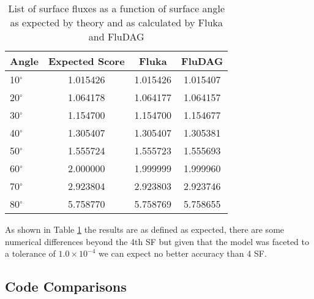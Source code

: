 \documentclass{anstrans}
\begin{document}

\begin{table}[h!]
        \begin{center}
                \begin{tabular}{|l|c|c|c|}
                  \hline
                        Angle & Expected Score & Fluka  & FluDAG \\
                        \hline
                        10$^{\circ}$ & 1.015426 & 1.015426 & 1.015407\\
                        20$^{\circ}$ & 1.064178 & 1.064177 & 1.064157\\
                        30$^{\circ}$ & 1.154700 & 1.154700 & 1.154677\\
                        40$^{\circ}$ & 1.305407 & 1.305407 & 1.305381\\
                        50$^{\circ}$ & 1.555724 & 1.555723 & 1.555693\\
                        60$^{\circ}$ & 2.000000 & 1.999999 & 1.999960\\
                        70$^{\circ}$ & 2.923804 & 2.923803 & 2.923746\\
                        80$^{\circ}$ & 5.758770 & 5.758769 & 5.758655\\
                        \hline
                \end{tabular}
                \caption{List of surface fluxes as a function of surface
                         angle as expected by theory and as calculated by 
                         Fluka and FluDAG}
                \label{usrbdx_crossing}
                \end{center}
\end{table}
As shown in Table \ref{usrbdx_crossing} the results are as defined as expected, 
there are some numerical differences beyond the 4th SF but given that the model
was faceted to a tolerance of $1.0\times 10^{-4}$ we can expect no better accuracy 
than 4 SF.

\subsection{Code Comparisons}
\end{document}
